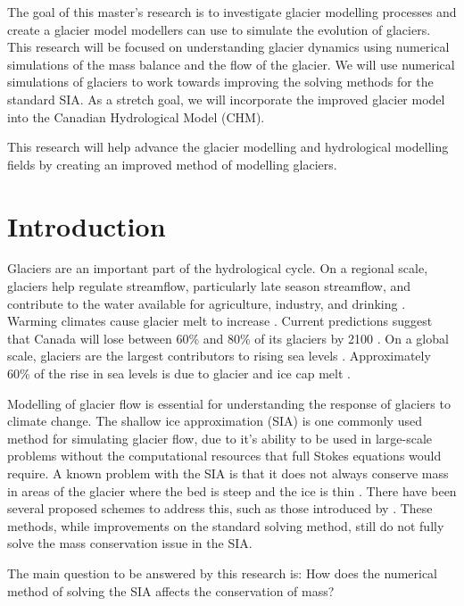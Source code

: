 \documentclass{article}
\begin{document}
The goal of this master's research is to investigate glacier modelling processes and create a glacier model modellers can use to simulate the evolution of glaciers. This research will be focused on understanding glacier dynamics using numerical simulations of the mass balance and the flow of the glacier. We will use numerical simulations of glaciers to work towards improving the solving methods for the standard SIA. As a stretch goal, we will incorporate the improved glacier model into the Canadian Hydrological Model (CHM).

This research will help advance the glacier modelling and hydrological modelling fields by creating an improved method of modelling glaciers. 

\newpage
\section{Introduction}
Glaciers are an important part of the hydrological cycle. On a regional scale, glaciers help regulate streamflow, particularly late season streamflow, and contribute to the water available for agriculture, industry, and drinking \citep{Naz2014, Kaser2010, Meier2007}. Warming climates cause glacier melt to increase \citep{Meier2007, Clarke2015, Kaser2010}. Current predictions suggest that Canada will lose between 60\% and 80\% of its glaciers by 2100 \citep{Clarke2015}. On a global scale,  glaciers are the largest contributors to rising sea levels \citep{Marzeion2012}. Approximately 60\% of the rise in sea levels is due to glacier and ice cap melt \citep{Meier2007}.

Modelling of glacier flow is essential for understanding the response of glaciers to climate change. The shallow ice approximation (SIA) is one commonly used method for simulating glacier flow, due to it's ability to be used in large-scale problems without the computational resources that full Stokes equations would require. A known problem with the SIA is that it does not always conserve mass in areas of the glacier where the bed is steep and the ice is thin \citep{Jarosch2013, Hindmarsh1996}. There have been several proposed schemes to address this, such as those introduced by \citet{Jarosch2013, Clarke2015}. These methods, while improvements on the standard solving method, still do not fully solve the mass conservation issue in the SIA. 

The main question to be answered by this research is: How does the numerical method of solving the SIA affects the conservation of mass? 
\end{document}
